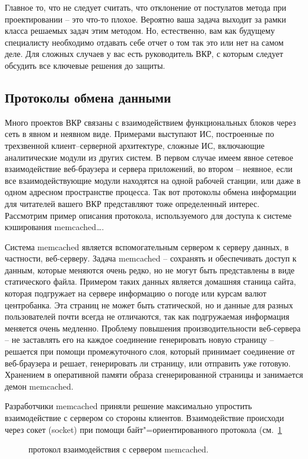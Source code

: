 \documentclass[a4paper,14pt,final]{extreport}
\begin{document}
Главное то, что не следует считать, что отклонение от постулатов метода при проектировании -- это что-то плохое.  Вероятно ваша задача выходит за рамки класса решаемых задач этим методом.  Но, естественно, вам как будущему специалисту необходимо отдавать себе отчет о том так это или нет на самом деле.  Для сложных случаев у вас есть руководитель ВКР, с которым следует обсудить все ключевые решения до защиты.

\subsection{Протоколы обмена данными}
\label{sec:protodescr}

Много проектов ВКР связаны с взаимодействием функциональных блоков через сеть в явном и неявном виде.  Примерами выступают ИС, построенные по трехзвенной клиент--серверной архитектуре, сложные ИС, включающие аналитические модули из других систем.  В первом случае имеем явное сетевое взаимодействие веб-браузера и сервера приложений, во втором -- неявное, если все взаимодействующие модули находятся на одной рабочей станции, или даже в одном адресном пространстве процесса.  Так вот протоколы обмена информации для читателей вашего ВКР представляют тоже определенный интерес.  Рассмотрим пример описания протокола, используемого для доступа к системе кэширования memcached\ldots{}.

Система memcached является вспомогательным сервером к серверу данных, в частности, веб-серверу.  Задача memcached -- сохранять и обеспечивать доступ к данным, которые меняются очень редко, но не могут быть представлены в виде статического файла.  Примером таких данных является домашняя станица сайта, которая подгружает на сервере информацию о погоде или курсам валют центробанка.  Эта страниц не может быть статической, но и данные для разных пользователей почти всегда не отличаются, так как подгружаемая информация меняется очень медленно.  Проблему повышения производительности веб-сервера -- не заставлять его на каждое соединение генерировать новую страницу -- решается при помощи промежуточного слоя, который принимает соединение от веб-браузера и решает, генерировать ли страницу, или отправить уже готовую.  Хранением в оперативной памяти образа сгенерированной страницы и занимается демон memcached.

Разработчики memcached приняли решение максимально упростить взаимодействие с сервером со стороны клиентов.  Взаимодействие происходи через сокет (socket) при помощи байт"=ориентированного протокола (см.~\ref{fig:memcached}
\begin{figure}[hbt]
  \centering

  \caption[Протокол memcached]{протокол взаимодействия с сервером memcached.}
  \label{fig:memcached}
\end{figure}
\end{document}
